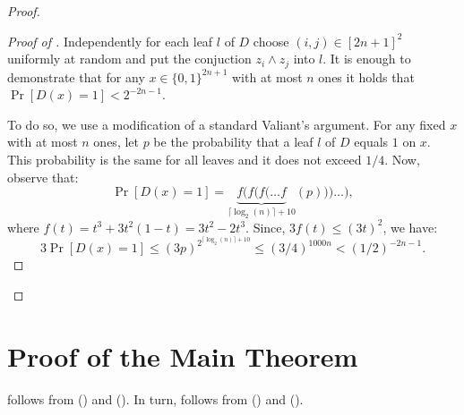\begin{proof}
\begin{proof}[Proof of ]
Independently for each leaf $l$ of $D$ choose $(i, j) \in [2n + 1]^2$ uniformly at random and put the  conjuction $z_i \land z_j$ into $l$. It is enough to demonstrate that for any $x\in\{0, 1\}^{2n + 1}$ with at most $n$ ones it holds that $\Pr[D(x) = 1] < 2^{-2n - 1}$. 

To do so, we use a modification of a standard Valiant's argument. For any fixed $x$ with at most $n$ ones, let $p$ be the probability that a leaf $l$ of $D$ equals $1$ on $x$. This probability is the same for all leaves and it does not exceed $1/4$. Now, observe that:
\[\Pr[D(x) = 1] = \underbrace{f(f(f(\ldots f}_{\text{$\lceil\log_2(n)\rceil + 10$}}(p)))\ldots),\]
where $f(t) = t^3 + 3 t^2 (1 - t) = 3t^2 -2t^3$. Since, $3f(t) \le (3t)^2$, we have:
\[3\Pr[D(x) = 1] \le (3p)^{2^{\lceil\log_2(n)\rceil + 10}}\le (3/4)^{1000 n} < (1/2)^{-2n - 1}.\]
\end{proof}
\end{proof}





























\section{Proof of the Main Theorem} \label{sec:proof_main}

 follows from  () and  ().  In turn,  follows from  () and  (). 



